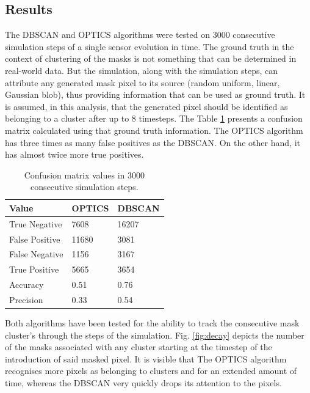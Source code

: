  \subsection{Results}


The DBSCAN and OPTICS algorithms were tested on 3000 consecutive simulation steps of a single sensor evolution in time.
The ground truth in the context of clustering of the masks is not something that can be determined in real-world data.
But the simulation, along with the simulation steps, can attribute any generated mask pixel to its source (random uniform, linear, Gaussian blob), thus providing information that can be used as ground truth.
It is assumed, in this analysis, that the generated pixel should be identified as belonging to a cluster after up to 8 timesteps.
The Table \ref{sample-table} presents a confusion matrix calculated using that ground truth information. The OPTICS algorithm has three times as many false positives as the DBSCAN. On the other hand, it has almost twice more true positives.


\begin{table}[H]
  \caption{Confusion matrix values in 3000 consecutive simulation steps.}
  \label{sample-table}
  \centering
  \begin{tabular}{lll}


    \toprule
    Value     & OPTICS     & DBSCAN \\
    \midrule
    True Negative & 7608 & 16207 \\
    False Positive    & 11680 & 3081      \\
    False Negative     & 1156       & 3167  \\
    True Positive &  5665 &   3654   \\
    \midrule
    Accuracy &  0.51 &   0.76   \\
    Precision &  0.33 &   0.54   \\
    \bottomrule

  \end{tabular}
\end{table}

Both algorithms have been tested for the ability to track the consecutive mask cluster's through the steps of the simulation. Fig. \ref{fig:decay} depicts the number of the masks associated with any cluster starting at the timestep of the introduction of said masked pixel. It is visible that The OPTICS algorithm recognises more pixels as belonging to clusters and for an extended amount of time, whereas the DBSCAN very quickly drops its attention to the pixels.

